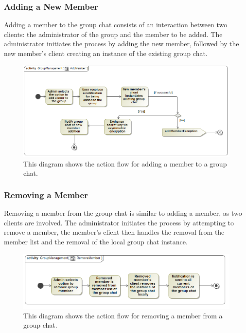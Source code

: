 \documentclass[11pt]{article}
\begin{document}
\subsubsection{Adding a New Member}
Adding a member to the group chat consists of an interaction between two clients: the administrator of the group and the member to be added. The administrator initiates the process by adding the new member, followed by the new member's client creating an instance of the existing group chat.
\begin{figure}[H]
\centering
\includegraphics[width=5in]{./images/activity_add_member.png}
\caption[Add Member Activity Diagram]{This diagram shows the action flow for adding a member to a group chat.}
\label{ad-add-member}
\end{figure}
\subsubsection{Removing a Member}
Removing a member from the group chat is similar to adding a member, as two clients are involved. The administrator initiates the process by attempting to remove a member, the member's client then handles the removal from the member list and the removal of the local group chat instance.
\begin{figure}[H]
\centering
\includegraphics[width=5in]{./images/activity_remove_member.png}
\caption[Add Member Activity Diagram]{This diagram shows the action flow for removing a member from a group chat.}
\label{ad-remove-member}
\end{figure}
\end{document}
